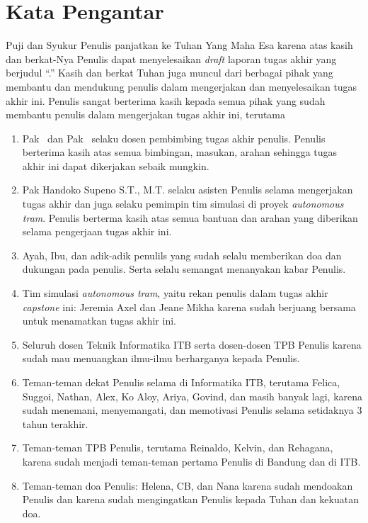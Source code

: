\chapter*{Kata Pengantar}

Puji dan Syukur Penulis panjatkan ke Tuhan Yang Maha Esa karena atas kasih dan
berkat-Nya Penulis dapat menyelesaikan \textit{draft} laporan tugas akhir yang
berjudul ``\thetitle.'' Kasih dan berkat Tuhan juga muncul dari berbagai pihak
yang membantu dan mendukung penulis dalam mengerjakan dan menyelesaikan tugas
akhir ini. Penulis sangat berterima kasih kepada semua pihak yang sudah membantu
penulis dalam mengerjakan tugas akhir ini, terutama

\begin{enumerate}
	\item Pak \pembimbingSatu\ dan Pak \pembimbingDua\ selaku dosen pembimbing
	      tugas akhir penulis. Penulis berterima kasih atas semua bimbingan, masukan,
	      arahan sehingga tugas akhir ini dapat dikerjakan sebaik mungkin.
	\item Pak Handoko Supeno S.T., M.T. selaku asisten Penulis selama
	      mengerjakan tugas akhir dan juga selaku pemimpin tim simulasi di proyek
	      \textit{autonomous tram}. Penulis berterma kasih atas semua bantuan dan
	      arahan yang diberikan selama pengerjaan tugas akhir ini.
	\item Ayah, Ibu, dan adik-adik penulils yang sudah selalu memberikan doa dan
	      dukungan pada penulis. Serta selalu semangat menanyakan kabar Penulis.
	\item Tim simulasi \textit{autonomous tram}, yaitu rekan penulis dalam tugas
	      akhir \textit{capstone} ini: Jeremia Axel dan Jeane Mikha karena sudah
	      berjuang bersama untuk menamatkan tugas akhir ini.
	\item Seluruh dosen Teknik Informatika ITB serta dosen-dosen TPB Penulis
	      karena sudah mau menuangkan ilmu-ilmu berharganya kepada Penulis.
	\item Teman-teman dekat Penulis selama di Informatika ITB, terutama Felica,
	      Suggoi, Nathan, Alex, Ko Aloy, Ariya, Govind, dan masih banyak lagi, karena
	      sudah menemani, menyemangati, dan memotivasi Penulis selama setidaknya 3
	      tahun terakhir.
	\item Teman-teman TPB Penulis, terutama Reinaldo, Kelvin, dan Rehagana,
	      karena sudah menjadi teman-teman pertama Penulis di Bandung dan di ITB.
	\item Teman-teman doa Penulis: Helena, CB, dan Nana karena sudah mendoakan
	      Penulis dan karena sudah mengingatkan Penulis kepada Tuhan dan kekuatan doa.
\end{enumerate}
